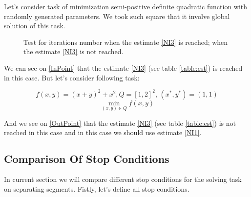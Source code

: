 \documentclass[12pt]{article}
\begin{document}
Let's consider task of minimization semi-positive definite quadratic function with randomly generated parameters. We took such square that it involve global solution of this task.

\begin{figure}[ht!]  
\vspace{-4ex} \centering {}  
\hspace{1.2ex}
\caption{Test for iterations number   when the estimate \ref{NI3} is reached;  when the estimate \ref{NI3} is not reached.} \label{fig:threeDMcases}
\end{figure}



We can see on \ref{InPoint} that the estimate \ref{NI3} (see table \ref{table:est}) is reached in this case. But let's consider following task:

$$f(x,y) = (x+y)^2+x^2, Q = [1,2]^2,\,(x^*, y^*) = (1,1)$$
$$\min\limits_{(x,y)\in Q}f(x,y)$$

And we see on \ref{OutPoint} that the estimate \ref{NI3} (see table \ref{table:est}) is not reached in this case and in this case we should use estimate \ref{NI1}.

\subsection{Comparison Of Stop Conditions}

In current section we will compare different stop conditions for the solving task on separating segments. Fistly, let's define all stop conditions.
\end{document}
